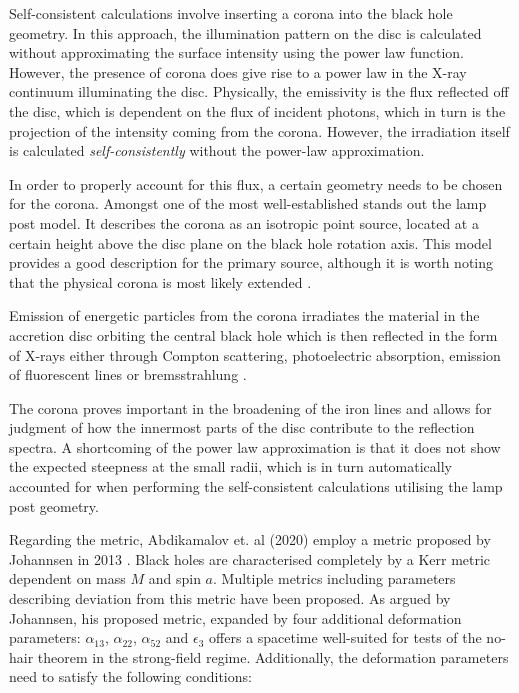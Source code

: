 \documentclass[fleqn,usenatbib,useAMS]{mnras}
\begin{document}
Self-consistent calculations involve inserting a corona into the black hole geometry. In this approach, the illumination pattern on the disc is calculated without approximating the surface intensity using the power law function. However, the presence of corona does give rise to a power law in the X-ray continuum illuminating the disc. Physically, the emissivity is the flux reflected off the disc, which is dependent on the flux of incident photons, which in turn is the projection of the intensity coming from the corona. However, the irradiation itself is calculated \textit{self-consistently} without the power-law approximation.

In order to properly account for this flux, a certain geometry needs to be chosen for the corona. Amongst one of the most well-established stands out the lamp post model. It describes the corona as an isotropic point source, located at a certain height above the disc plane on the black hole rotation axis. This model provides a good description for the primary source, although it is worth noting that the physical corona is most likely extended \cite{wilkins2015driving}. 

Emission of energetic particles from the corona irradiates the material in the accretion disc orbiting the central black hole \cite{george1991x} which is then reflected in the form of X-rays either through Compton scattering, photoelectric absorption, emission of fluorescent lines or bremsstrahlung \cite{ross2005comprehensive}.

The corona proves important in the broadening of the iron lines and allows for judgment of how the innermost parts of the disc contribute to the reflection spectra. A shortcoming of the power law approximation is that it does not show the expected steepness at the small radii, which is in turn automatically accounted for when performing the self-consistent calculations utilising the lamp post geometry\cite{dauser2016relativistic}. 

Regarding the metric, Abdikamalov et. al (2020) \cite{abdikamalov2020testing} employ a metric proposed by Johannsen in 2013 \cite{johannsen2013regular}. Black holes are characterised completely by a Kerr metric dependent on mass $M$ and spin $a$. Multiple metrics including parameters describing deviation from this metric have been proposed. As argued by Johannsen, his proposed metric, expanded by four additional deformation parameters: $\alpha_{13}$, $\alpha_{22}$, $\alpha_{52}$ and $\epsilon_{3}$ offers a spacetime well-suited for tests of the no-hair theorem in the strong-field regime. Additionally, the deformation parameters need to satisfy the following conditions\cite{johannsen2013regular}:
\end{document}

